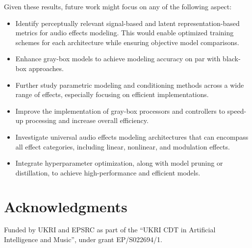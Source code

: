 Given these results, future work might focus on any of the following aspect:
\begin{itemize}
    \item Identify perceptually relevant signal-based and latent representation-based metrics for audio effects modeling. This would enable optimized training schemes for each architecture while ensuring objective model comparisons.
    \item Enhance gray-box models to achieve modeling accuracy on par with black-box approaches.
    \item Further study parametric modeling and conditioning methods across a wide range of effects, especially focusing on efficient implementations.
    \item Improve the implementation of gray-box processors and controllers to speed-up processing and increase overall efficiency.
    \item Investigate universal audio effects modeling architectures that can encompass all effect categories, including linear, nonlinear, and modulation effects.
    \item Integrate hyperparameter optimization, along with model pruning or distillation, to achieve high-performance and efficient models.
\end{itemize}

\section{Acknowledgments}
Funded by UKRI and EPSRC as part of the “UKRI CDT in Artificial Intelligence and Music”, under grant EP/S022694/1.